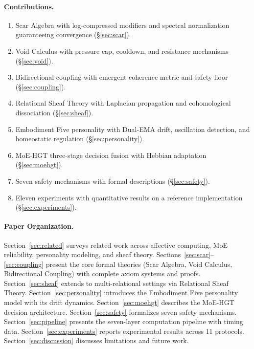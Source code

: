 \documentclass[11pt]{article}
\begin{document}
\paragraph{Contributions.}
\begin{enumerate}[leftmargin=*]
\item Scar Algebra with log-compressed modifiers and spectral normalization guaranteeing convergence (\S\ref{sec:scar}).
\item Void Calculus with pressure cap, cooldown, and resistance mechanisms (\S\ref{sec:void}).
\item Bidirectional coupling with emergent coherence metric and safety floor (\S\ref{sec:coupling}).
\item Relational Sheaf Theory with Laplacian propagation and cohomological dissociation (\S\ref{sec:sheaf}).
\item Embodiment Five personality with Dual-EMA drift, oscillation detection, and homeostatic regulation (\S\ref{sec:personality}).
\item MoE-HGT three-stage decision fusion with Hebbian adaptation (\S\ref{sec:moehgt}).
\item Seven safety mechanisms with formal descriptions (\S\ref{sec:safety}).
\item Eleven experiments with quantitative results on a reference implementation (\S\ref{sec:experiments}).
\end{enumerate}

\paragraph{Paper Organization.}
Section~\ref{sec:related} surveys related work across affective computing, MoE reliability, personality modeling, and sheaf theory. Sections~\ref{sec:scar}--\ref{sec:coupling} present the core formal theories (Scar Algebra, Void Calculus, Bidirectional Coupling) with complete axiom systems and proofs. Section~\ref{sec:sheaf} extends to multi-relational settings via Relational Sheaf Theory. Section~\ref{sec:personality} introduces the Embodiment Five personality model with its drift dynamics. Section~\ref{sec:moehgt} describes the MoE-HGT decision architecture. Section~\ref{sec:safety} formalizes seven safety mechanisms. Section~\ref{sec:pipeline} presents the seven-layer computation pipeline with timing data. Section~\ref{sec:experiments} reports experimental results across 11 protocols. Section~\ref{sec:discussion} discusses limitations and future work.
\end{document}
